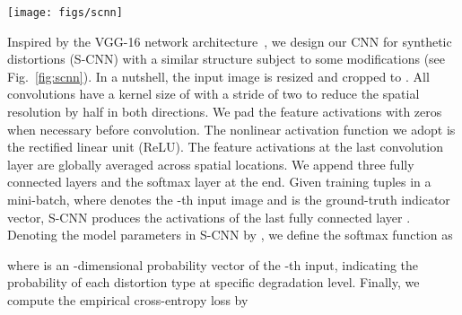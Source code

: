 \documentclass[journal]{IEEEtran}
\begin{document}
\begin{figure*}[t]
  \centering
  \texttt{[image: figs/scnn]}
  \caption{The architecture of S-CNN  for synthetic distortions. We follow the style and convention in~\cite{BalleLS16a}, and denote the parameterization of the convolution layer as ``height  width  input channel  output channel  stride  padding''. For brevity, we ignore all ReLU layers here.}\label{fig:scnn}
\end{figure*}

Inspired by the VGG-16 network architecture~\cite{simonyan2014very}, we design our CNN for synthetic distortions (S-CNN) with a similar structure subject to some modifications (see Fig.~\ref{fig:scnn}). In a nutshell, the input image is resized and cropped to . All convolutions have a kernel size of  with a stride of two to reduce the spatial resolution by half in both directions.
We pad the feature activations with zeros when necessary before convolution. The nonlinear activation function we adopt is the rectified linear unit (ReLU).
The feature activations at the last convolution layer are globally averaged across spatial locations. We append three fully connected layers and the softmax layer at the end. Given  training tuples  in a mini-batch, where  denotes the -th input image and  is the ground-truth indicator vector, S-CNN produces the activations of the last fully connected layer . Denoting the model parameters in S-CNN by , we define the softmax function as




where  is an -dimensional probability vector of the -th input, indicating the probability of each distortion type at specific degradation level. Finally, we compute the empirical cross-entropy loss by
\end{document}
